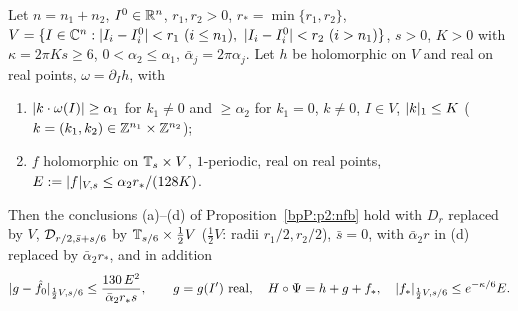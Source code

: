 \begin{lemma}\label{bpP:p11:aniso-avg}
Let $n=n_1+n_2$, $I^0\in\mathbb{R}^n$, $r_1,r_2>0$, $r_*=\min\{r_1,r_2\}$, $V=\{I\in\mathbb{C}^n:\lvert I_i-I_i^0\rvert<r_1\ (i\le n_1),\ \lvert I_i-I^0_i\rvert<r_2\ (i>n_1)\}$, $s>0$, $K>0$ with $\kappa=2\pi Ks\ge6$, $0<\alpha_2\le\alpha_1$, $\bar\alpha_j=2\pi\alpha_j$. Let $h$ be holomorphic on $V$ and real on real points, $\omega=\partial_Ih$, with
\begin{enumerate}[label=(B\arabic*)]
\item $\lvert k\cdot\omega(I)\rvert\ge\alpha_1$ for $k_1\ne0$ and $\ge\alpha_2$ for $k_1=0$, $k\ne0$, $I\in V$, $\lvert k\rvert_1\le K$ ($k=(k_1,k_2)\in\mathbb{Z}^{n_1}\times\mathbb{Z}^{n_2}$);
\item $f$ holomorphic on $\mathbb{T}_{s}\times V$, $1$-periodic, real on real points, $E:=\lvert f\rvert_{V,s}\le\alpha_2r_*/(128K)$.
\end{enumerate}
Then the conclusions (a)--(d) of Proposition~\ref{bpP:p2:nfb} hold with $D_{r}$ replaced by $V$, $\mathcal D_{r/2,\bar s+s/6}$ by $\mathbb{T}_{s/6}\times\tfrac12V$ ($\tfrac12V$: radii $r_1/2,r_2/2$), $\bar s=0$, with $\bar\alpha_2r$ in (d) replaced by $\bar\alpha_2r_*$, and in addition
\[\wn{g-\hat f_0}{\frac12V}{s/6}\le\frac{130\,E^2}{\bar\alpha_2r_*s},\qquad g=g(I')\ \text{real},\quad H\circ\Psi=h+g+f_*,\quad\wn{f_*}{\frac12V}{s/6}\le e^{-\kappa/6}E.\]
\end{lemma}
